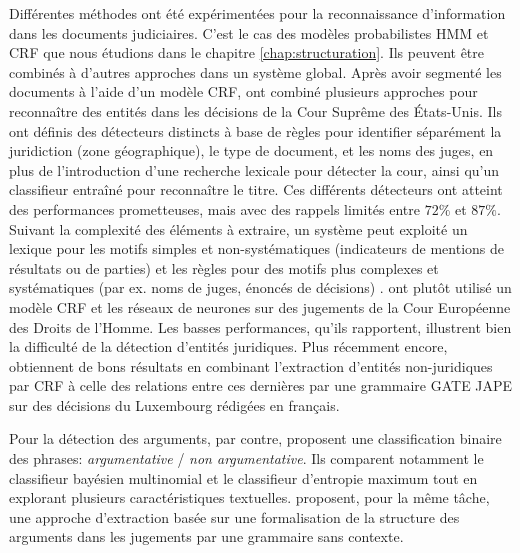 Différentes méthodes ont été expérimentées pour la reconnaissance d'information dans les documents judiciaires. C'est le cas des modèles probabilistes HMM et CRF que nous étudions dans le chapitre \ref{chap:structuration}. Ils peuvent être combinés à d'autres approches dans un système global. Après avoir segmenté les documents à l'aide d'un modèle CRF, \citet{dozier2010legalnerr} ont combiné plusieurs approches pour reconnaître des entités dans les décisions de la Cour Suprême des États-Unis. Ils ont définis des détecteurs distincts à base de règles pour identifier séparément la juridiction (zone géographique), le type de document, et les noms des juges, en plus de l'introduction d'une recherche lexicale pour détecter la cour, ainsi qu'un classifieur entraîné pour reconnaître le titre. Ces différents détecteurs ont atteint des performances prometteuses, mais avec des rappels limités entre $ 72 \% $ et $ 87 \% $. Suivant la complexité des éléments à extraire, un système peut exploité un lexique pour les motifs simples et non-systématiques (indicateurs de mentions de résultats ou de parties) et les règles pour des motifs plus complexes et systématiques (par ex. noms de juges, énoncés de décisions) \citep{Waltl2016lexia,waltl2017legaliegerman, wyner2010extractlegalelts}. \cite{cardellino2017legalNERCL} ont plutôt utilisé un modèle CRF et les réseaux de neurones sur des jugements de la Cour Européenne des Droits de l'Homme. Les basses performances, qu'ils rapportent, illustrent bien la difficulté de la détection d'entités juridiques. Plus récemment encore, \citet{andrew2018legalNerAndRelation} obtiennent de bons résultats en combinant l'extraction d'entités non-juridiques par CRF à celle des relations entre ces dernières par une grammaire GATE JAPE \citep{thakker2009gatejape} sur des décisions du Luxembourg rédigées en français.

 Pour la détection des arguments, par contre, \citet{moens2007NBvsMaxent4arguments} proposent une classification binaire des phrases: \textit{argumentative} / \textit{non argumentative}. Ils comparent notamment le classifieur bayésien multinomial et le classifieur d'entropie maximum tout en explorant plusieurs caractéristiques textuelles. \citet{mochales2008contextfreegrammararg} proposent, pour la même tâche, une approche d'extraction basée sur une formalisation de la structure des arguments dans les jugements par une grammaire sans contexte. 


